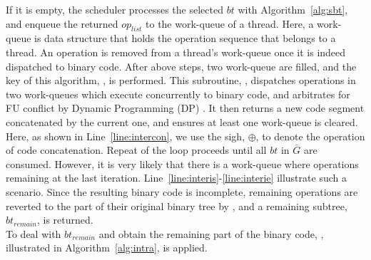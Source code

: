 If it is empty, the scheduler processes the selected $bt$ with Algorithm~\ref{alg:sbt}, 
and enqueue the returned $op_{list}$ to the work-queue of a thread.
Here, a work-queue is data structure that holds the operation sequence that belongs to a thread.
An operation is removed from a thread's work-queue once it is indeed dispatched to binary code.
After above steps, two work-queue are filled, and the key of this algorithm, , is performed.
This subroutine, , dispatches operations in two work-queues which execute concurrently to binary code, 
and arbitrates for FU conflict by Dynamic Programming (DP) \cite{dp}.
It then returns a new code segment concatenated by the current one, and ensures at least one work-queue is cleared.
Here, as shown in Line~\ref{line:intercon}, we use the sigh, $\oplus$, to denote the operation of code concatenation.
Repeat of the loop proceeds until all $bt$ in $\bar{G}$ are consumed.
However, it is very likely that there is a work-queue where operations remaining at the last iteration.
Line~\ref{line:interis}-\ref{line:interie} illustrate such a scenario.
Since the resulting binary code is incomplete, 
remaining operations are reverted to the part of their original binary tree by ,
and a remaining subtree, $bt_{remain}$, is returned.
\\\indent 
To deal with $bt_{remain}$ and obtain the remaining part of the binary code, 
, illustrated in Algorithm~\ref{alg:intra}, is applied.
